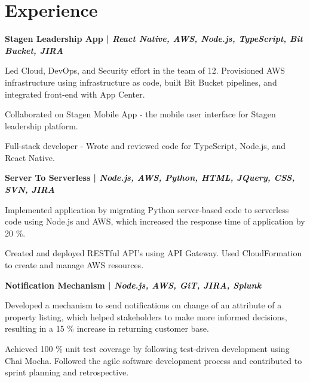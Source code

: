 \documentclass[]{deedy-resume-openfont}
\begin{document}
\hfill
\begin{minipage}[t]{0.66\textwidth} 


\section{Experience}

\sectionsep

\textbf{Stagen Leadership App | \emph{React Native, AWS, Node.js, TypeScript, Bit Bucket, JIRA} }
\vspace{\topsep} %
\begin{tightemize}
\item Led Cloud, DevOps, and Security effort in the team of 12. Provisioned AWS infrastructure using infrastructure as code, built Bit Bucket pipelines, and integrated front-end with App Center.
\item Collaborated on Stagen Mobile App - the mobile user interface for Stagen leadership platform.
\item Full-stack developer - Wrote and reviewed code for TypeScript, Node.js, and React Native. 
\end{tightemize}
\sectionsep

\textbf{Server To Serverless | \emph{Node.js, AWS, Python, HTML, JQuery, CSS, SVN, JIRA} }
\begin{tightemize}
\item Implemented application by migrating Python server-based code to serverless code using Node.js and AWS, which increased the response time of application by 20 \%.
\item Created and deployed RESTful API’s using API Gateway. Used CloudFormation to create and manage AWS resources.
\end{tightemize}
\sectionsep
\textbf{Notification Mechanism  | \emph{Node.js, AWS, GiT, JIRA, Splunk } }
\begin{tightemize}
\item Developed a mechanism to send notifications on change of an attribute of a property listing, which helped stakeholders to make more informed decisions, resulting in a 15 \% increase in returning customer base.
\item Achieved 100 \% unit test coverage by following test-driven development using Chai Mocha. Followed the agile software development process and contributed to sprint planning and retrospective.
\end{tightemize}
\sectionsep


\end{minipage}
\end{document}
